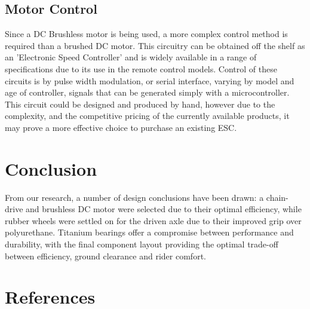 \documentclass[journal,10pt]{IEEEtran}
\begin{document}
    \subsection{Motor Control}
    		Since a DC Brushless motor is being used, a more complex control method is required than a brushed DC motor.
    		This circuitry can be obtained off the shelf as an 'Electronic Speed Controller' and is widely available in a range of specifications due to its use in the remote control models.
    		Control of these circuits is by pulse width modulation, or serial interface, varying by model and age of controller, signals that can be generated simply with a microcontroller.
    		This circuit could be designed and produced by hand, however due to the complexity, and the competitive pricing of the currently available products, it may prove a more effective choice to purchase an existing ESC.
\section{Conclusion}
From our research, a number of design conclusions have been drawn: a chain-drive and brushless DC motor were selected due to their optimal efficiency, while rubber wheels were settled on for the driven axle due to their improved grip over polyurethane. Titanium bearings offer a compromise between performance and durability, with the final component layout providing the optimal trade-off between efficiency, ground clearance and rider comfort.
\section{References}
\end{document}
